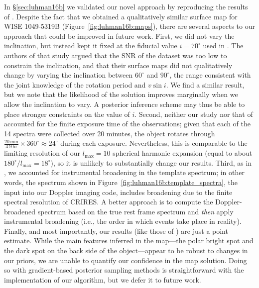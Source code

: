 \documentclass[modern]{aastex631}
\begin{document}
In \S\ref{sec:luhman16b} we validated our novel approach by reproducing the results of \citet{Crossfield2014}. 
Despite the fact that we obtained a qualitatively similar surface map for WISE 1049-5319B (Figure~\ref{fig:luhman16b:maps}), there are several aspects to our approach that could be improved in future work. 
%
First, we did not vary the inclination, but instead kept it fixed at the fiducial value $i = 70^\circ$ used in \citet{Crossfield2014}. 
The authors of that study argued that the SNR of the dataset was too low to constrain the inclination, and that their surface maps did not qualitatively change by varying the inclination between $60^\circ$ and $90^\circ$, the range consistent with the joint knowledge of the rotation period and $v\sin i$. 
We find a similar result, but we note that the likelihood of the solution improves marginally when we allow the inclination to vary.
A posterior inference scheme may thus be able to place stronger constraints on the value of $i$.
%
Second, neither our study nor that of \citet{Crossfield2014} accounted for the finite exposure time of the observations; given that each of the 14 spectra were collected over 20 minutes, the object rotates through $\frac{20\,\mathrm{min}}{4.9\,\mathrm{hr}}\times 360^\circ \approx 24^\circ$ during each exposure.
Nevertheless, this is comparable to the limiting resolution of our $l_\mathrm{max} = 10$ spherical harmonic expansion (equal to about $180^\circ / l_\mathrm{max} = 18^\circ$), so it is unlikely to substantially change our results.
%
Third, as in \citet{Crossfield2014}, we accounted for instrumental broadening in the template spectrum; in other words, the spectrum shown in Figure~\ref{fig:luhman16b:template_spectra}, the input into our Doppler imaging code, includes broadening due to the finite spectral resolution of CRIRES.
A better approach is to compute the Doppler-broadened spectrum based on the true rest frame spectrum and \emph{then} apply instrumental broadening (i.e., the order in which events take place in reality).
%
Finally, and most importantly, our results (like those of \citet{Crossfield2014}) are just a point estimate.
While the main features inferred in the map---the polar bright spot and the dark spot on the back side of the object---appear to be robust to changes in our priors, we are unable to quantify our confidence in the map solution.
%
Doing so with gradient-based posterior sampling methods is straightforward with the \starry implementation of our algorithm, but we defer it to future work.
\end{document}
